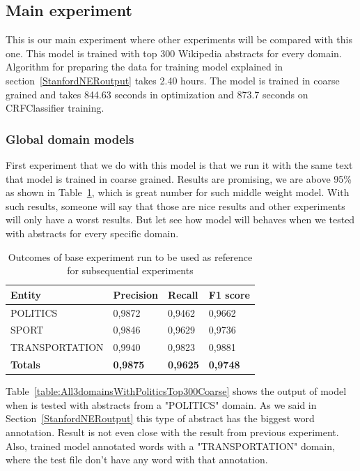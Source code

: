\documentclass[thesis=M,english]{FITthesis}[2018/05/30]
\begin{document}
\subsection{Main experiment}\label{MainExperiment}
	This is our main experiment where other experiments will be compared with this one. This model is trained with top 300 Wikipedia abstracts for every domain. Algorithm for preparing the data for training model explained in section~\ref{StanfordNERoutput} takes 2.40 hours. The model is trained in coarse grained and takes 844.63 seconds in optimization and 873.7 seconds on CRFClassifier training.

\subsubsection{Global domain models}
	First experiment that we do with this model is that we run it with the same text that model is trained in coarse grained. Results are promising, we are above 95\% as shown in Table~\ref{table:All3domainsWithAll3DomiansTop300Coarse}, which is great number for such middle weight model. With such results, someone will say that those are nice results and other experiments will only have a worst results. But let see how model will behaves when we tested with abstracts for every specific domain.

	\begin{table}[H]\centering
		\begin{tabular}{|l|l|l|l|}
			\hline {\textbf{Entity}} & {\textbf{Precision}} & {\textbf{Recall}} & {\textbf{F1 score}}\\\hline
				POLITICS & 0,9872 & 0,9462 & 0,9662\\
				SPORT & 0,9846 & 0,9629 & 0,9736\\
				TRANSPORTATION & 0,9940 & 0,9823 & 0,9881\\\hline
				\textbf{Totals} & \textbf{0,9875} & \textbf{0,9625} & \textbf{0,9748}\\\hline
		\end{tabular}
		\caption{Outcomes of base experiment run to be used as reference for subsequential experiments \label{table:All3domainsWithAll3DomiansTop300Coarse}}
	\end{table}	
	
	Table~\ref{table:All3domainsWithPoliticsTop300Coarse} shows the output of model when is tested with abstracts from a "POLITICS" domain. As we said in Section~\ref{StanfordNERoutput} this type of abstract has the biggest word annotation. Result is not even close with the result from previous experiment. Also, trained model annotated words with a "TRANSPORTATION" domain, where the test file don't have any word with that annotation. 
	
\end{document}
